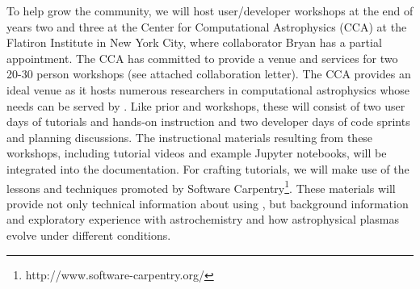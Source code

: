 To help grow the \grackle{} community, we will host user/developer
workshops at the end of years two and three at the Center for
Computational Astrophysics (CCA) at the Flatiron Institute in New York
City, where collaborator Bryan has a partial appointment.  The CCA has
committed to provide a venue and services for two 20-30 person
workshops (see attached collaboration letter).  The CCA provides an
ideal venue as it hosts numerous researchers in computational
astrophysics whose needs can be served by \grackle{}.  Like prior
\enzo{} and \yt{} workshops, these will consist of two user days of
tutorials and hands-on instruction and two developer days of code
sprints and planning discussions.  The instructional materials
resulting from these workshops, including tutorial videos and example
Jupyter notebooks, will be integrated into the \grackle{}
documentation. For crafting tutorials, we will make use of the lessons
and techniques promoted by Software
Carpentry\footnote{http://www.software-carpentry.org/}.  These materials will
provide not only technical information about using \grackle{}, but background
information and exploratory experience with astrochemistry and how
astrophysical plasmas evolve under different conditions.
